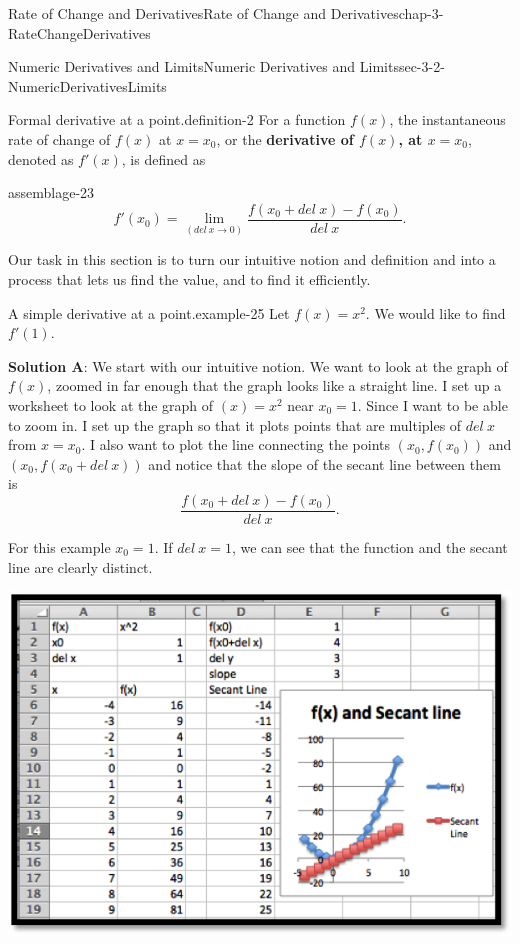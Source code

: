 \documentclass[oneside,10pt,]{book}
\newcommand{\terminology}[1]{\textbf{#1}}
\numberwithin{equation}{section}
\begin{document}
\begin{chapterptx}{Rate of Change and Derivatives}{}{Rate of Change and Derivatives}{}{}{chap-3-RateChangeDerivatives}
\begin{sectionptx}{Numeric Derivatives and Limits}{}{Numeric Derivatives and Limits}{}{}{sec-3-2-NumericDerivativesLimits}
\begin{definition}{Formal derivative at a point.}{definition-2}%
\hypertarget{p-1017}{}%
For a function \(f(x)\), the instantaneous rate of change of \(f(x)\) at \(x=x_0\), or the \terminology{derivative of \(f(x)\), at \(x=x_0\)}, denoted as \(f'(x)\), is defined as%
\begin{assemblage}{}{assemblage-23}%
\hypertarget{p-1018}{}%
%
\begin{equation*}
f'(x_0 )=\lim_{(del\ x\to 0)}\frac{f(x_0+del\ x)-f(x_0)}{del\ x}.
\end{equation*}
%
\end{assemblage}
\end{definition}
\hypertarget{p-1019}{}%
Our task in this section is to turn our intuitive notion and definition and into a process that lets us find the value, and to find it efficiently.%
\begin{example}{A simple derivative at a point.}{example-25}%
\hypertarget{p-1020}{}%
Let \(f(x)=x^2\).  We would like to find \(f'(1)\).%
\par
\hypertarget{p-1021}{}%
\terminology{Solution A}: We start with our intuitive notion.  We want to look at the graph of \(f(x)\), zoomed in far enough that the graph looks like a straight line.  I set up a worksheet to look at the graph of \((x)=x^2\) near \(x_0=1\).  Since I want to be able to zoom in. I set up the graph so that it plots points that are multiples of \(del\ x\) from \(x=x_0\).  I also want to plot the line connecting the points \((x_0,f(x_0))\) and \((x_0,f(x_0+del\ x))\) and notice that the slope of the secant line between them is%
\begin{equation*}
\frac{f(x_0+del\ x)-f(x_0 )}{del\ x}.
\end{equation*}
%
\par
\hypertarget{p-1022}{}%
For this example \(x_0=1\). If \(del\ x=1\), we can see that the function and the secant line are clearly distinct.%
\begin{sidebyside}{1}{0.15}{0.15}{0}%
\begin{sbspanel}{0.7}%
\includegraphics[width=1\linewidth]{images/sec3-2-1.png}

\end{sbspanel}
\end{sidebyside}
\end{example}
\end{sectionptx}
\end{chapterptx}
\end{document}
